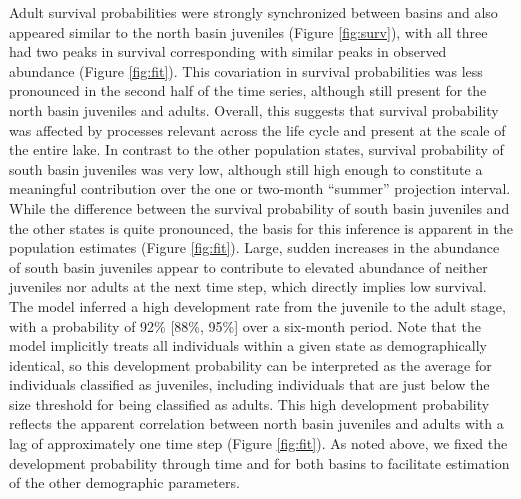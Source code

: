 Adult survival probabilities were strongly synchronized between basins 
and also appeared similar to the north basin juveniles (Figure \ref{fig:surv}),
with all three had two peaks in survival corresponding with 
similar peaks in observed abundance (Figure \ref{fig:fit}).
This covariation in survival probabilities was less pronounced in the second half 
of the time series, although still present for the north basin juveniles and adults.
Overall, this suggests that survival probability was affected by processes relevant across 
the life cycle and present at the scale of the entire lake.
In contrast to the other population states, 
survival probability of south basin juveniles was very low,
although still high enough to constitute a meaningful contribution over the one or two-month
``summer'' projection interval.
While the difference between the survival probability of south basin juveniles and 
the other states is quite pronounced, 
the basis for this inference is apparent 
in the population estimates (Figure \ref{fig:fit}). 
Large, sudden increases in the abundance of south basin juveniles appear to contribute
to elevated abundance of neither juveniles nor adults at the next time step,
which directly implies low survival.
The model inferred a high development rate from the juvenile to the adult stage,
with a probability of 92\% [88\%, 95\%] over a six-month period. 
Note that the model implicitly treats all individuals within a given state 
as demographically identical,
so this development probability can be interpreted as the average 
for individuals classified as juveniles, 
including individuals that are just below the size threshold for being classified as adults.
This high development probability reflects the apparent correlation between north basin
juveniles and adults with a lag of approximately one time step (Figure \ref{fig:fit}).
As noted above, we fixed the development probability through time and for both basins
to facilitate estimation of the other demographic parameters.

